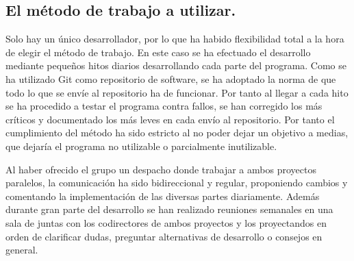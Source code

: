 \subsection{El método de trabajo a utilizar.}
	Solo hay un único desarrollador, por lo que ha habido flexibilidad total a la hora de elegir el método de trabajo. En este caso se ha efectuado el desarrollo mediante pequeños hitos diarios desarrollando cada parte del programa. Como se ha utilizado Git como repositorio de software, se ha adoptado la norma de que todo lo que se envíe al repositorio ha de funcionar. Por tanto al llegar a cada hito se ha procedido a testar el programa contra fallos, se han corregido los más críticos y documentado los más leves en cada envío al repositorio. Por tanto el cumplimiento del método ha sido estricto al no poder dejar un objetivo a medias, que dejaría el programa no utilizable o parcialmente inutilizable.
	
	Al haber ofrecido el grupo un despacho donde trabajar a ambos proyectos paralelos, la comunicación ha sido bidireccional y regular, proponiendo cambios y comentando la implementación de las diversas partes diariamente. Además durante gran parte del desarrollo se han realizado reuniones semanales en una sala de juntas con los codirectores de ambos proyectos y los proyectandos en orden de clarificar dudas, preguntar alternativas de desarrollo o consejos en general.

